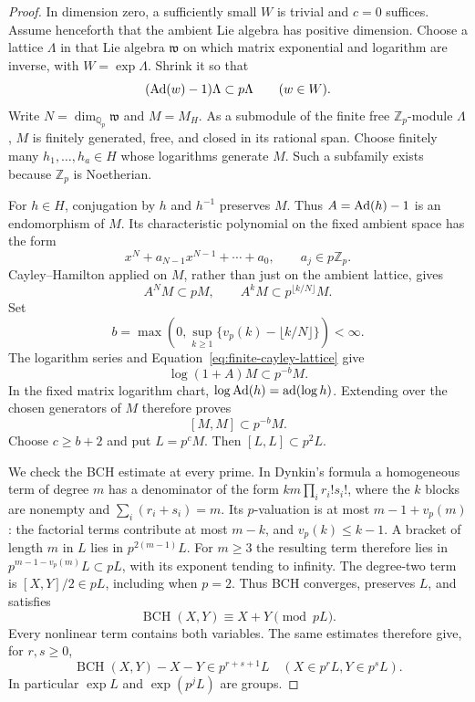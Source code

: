 \begin{proof}
In dimension zero, a sufficiently small $W$ is trivial and $c=0$
suffices.  Assume henceforth that the ambient Lie algebra has positive
dimension.  Choose a lattice $\Lambda$ in that Lie algebra $\mathfrak w$
on which matrix exponential and logarithm are inverse, with
$W=\exp\Lambda$.  Shrink it so that
\[
 (\operatorname{Ad}(w)-1)\Lambda\subset p\Lambda\qquad(w\in W).
\]
Write $N=\dim_{\mathbb Q_p}\mathfrak w$ and $M=M_H$.
As a submodule of the finite free $\mathbb Z_p$-module $\Lambda$,
$M$ is finitely generated, free, and closed in its rational span.
Choose finitely many $h_1,\ldots,h_a\in H$ whose logarithms generate
$M$.  Such a subfamily exists because $\mathbb Z_p$ is Noetherian.

For $h\in H$, conjugation by $h$ and $h^{-1}$ preserves $M$.
Thus $A=\operatorname{Ad}(h)-1$ is an endomorphism of $M$.  Its characteristic
polynomial on the fixed ambient space has the form
\[
 x^N+a_{N-1}x^{N-1}+\cdots+a_0,\qquad a_j\in p\mathbb Z_p.
\]
Cayley--Hamilton applied on $M$, rather than just on the ambient
lattice, gives
\begin{equation}
 A^NM\subset pM,\qquad
 A^kM\subset p^{\lfloor k/N\rfloor}M.
 \label{eq:finite-cayley-lattice}
\end{equation}
Set
\[
 b=\max\left(0,\sup_{k\geq1}
                    \{v_p(k)-\lfloor k/N\rfloor\}\right)<\infty.
\]
The logarithm series and Equation~\eqref{eq:finite-cayley-lattice}
give
\[
 \log(1+A)M\subset p^{-b}M.
\]
In the fixed matrix logarithm chart,
$\log\operatorname{Ad}(h)=\operatorname{ad}(\log h)$.
Extending over the chosen generators of $M$ therefore proves
\[
 [M,M]\subset p^{-b}M.
\]
Choose $c\geq b+2$ and put $L=p^cM$.  Then
$[L,L]\subset p^2L$.

We check the BCH estimate at every prime.  In Dynkin's formula a
homogeneous term of degree $m$ has a denominator of the form
$km\prod_i r_i!s_i!$, where the $k$ blocks are nonempty and
$\sum_i(r_i+s_i)=m$.  Its $p$-valuation is at most
$m-1+v_p(m)$: the factorial terms contribute at most $m-k$, and
$v_p(k)\leq k-1$.  A bracket of length $m$ in $L$ lies in
$p^{2(m-1)}L$.  For $m\geq3$ the resulting term therefore lies in
$p^{m-1-v_p(m)}L\subset pL$, with its exponent tending to infinity.
The degree-two term is $[X,Y]/2\in pL$, including when $p=2$.
Thus BCH converges, preserves $L$, and satisfies
\begin{equation}
 \operatorname{BCH}(X,Y)\equiv X+Y\pmod{pL}.
 \label{eq:finite-bch}
\end{equation}
Every nonlinear term contains both variables.  The same estimates
therefore give, for $r,s\geq0$,
\[
 \operatorname{BCH}(X,Y)-X-Y\in p^{r+s+1}L
 \quad(X\in p^rL, Y\in p^sL).
\]
In particular $\exp L$ and $\exp(p^jL)$ are groups.


\end{proof}
